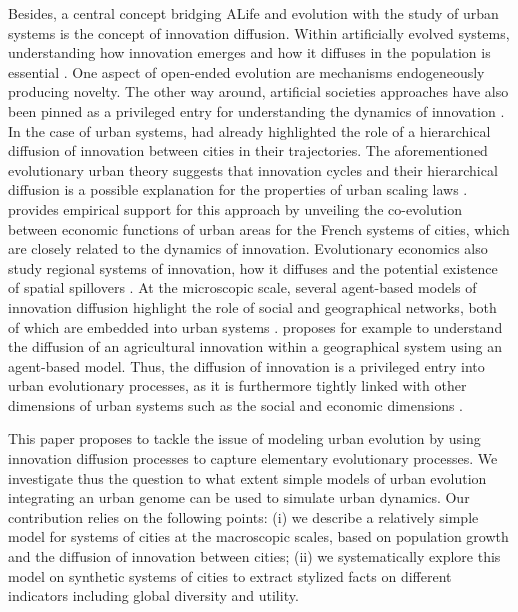 \documentclass[letterpaper]{article}
\begin{document}
Besides, a central concept bridging ALife and evolution with the study of urban systems is the concept of innovation diffusion. Within artificially evolved systems, understanding how innovation emerges and how it diffuses in the population is essential \citep{bedau2000open}. One aspect of open-ended evolution are mechanisms endogeneously producing novelty. The other way around, artificial societies approaches have also been pinned as a privileged entry for understanding the dynamics of innovation \citep{zenobia2009artificial}. In the case of urban systems, \cite{hagerstrand1968innovation} had already highlighted the role of a hierarchical diffusion of innovation between cities in their trajectories. The aforementioned evolutionary urban theory suggests that innovation cycles and their hierarchical diffusion is a possible explanation for the properties of urban scaling laws \citep{pumain2006evolutionary}. \cite{paulus2004co} provides empirical support for this approach by unveiling the co-evolution between economic functions of urban areas for the French systems of cities, which are closely related to the dynamics of innovation. Evolutionary economics also study regional systems of innovation, how it diffuses and the potential existence of spatial spillovers \citep{uyarra2010evolutionary}. At the microscopic scale, several agent-based models of innovation diffusion highlight the role of social and geographical networks, both of which are embedded into urban systems \citep{zhang2019empirically}. \cite{daude2004apports} proposes for example to understand the diffusion of an agricultural innovation within a geographical system using an agent-based model. Thus, the diffusion of innovation is a privileged entry into urban evolutionary processes, as it is furthermore tightly linked with other dimensions of urban systems such as the social and economic dimensions \citep{sonis1995territorial}.



This paper proposes to tackle the issue of modeling urban evolution by using innovation diffusion processes to capture elementary evolutionary processes. We investigate thus the question to what extent simple models of urban evolution integrating an urban genome can be used to simulate urban dynamics. Our contribution relies on the following points: (i) we describe a relatively simple model for systems of cities at the macroscopic scales, based on population growth and the diffusion of innovation between cities; (ii) we systematically explore this model on synthetic systems of cities to extract stylized facts on different indicators including global diversity and utility.
\end{document}
